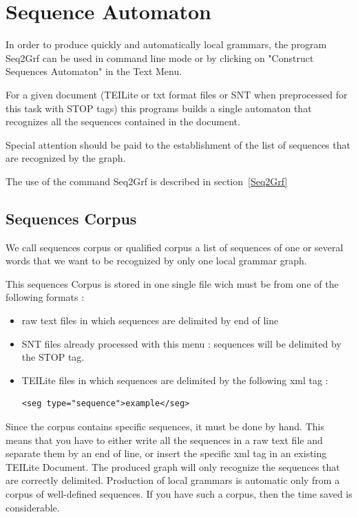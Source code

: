 \label{Sequence Automaton}
\chapter{Sequence Automaton}

In order to produce quickly and automatically local grammars, the program Seq2Grf can be used in command line mode or by clicking on "Construct Sequences Automaton" in the Text Menu.
\bigskip

For a given document (TEILite or txt format files or SNT when preprocessed for this task with {STOP} tags) this programs builds a single automaton that recognizes all the sequences contained in the document.
\bigskip

Special attention should be paid to the establishment of the list of sequences that are recognized by the graph.
\bigskip

The use of the command Seq2Grf is described in section~\ref{Seq2Grf}

\section{Sequences Corpus}
We call sequences corpus or qualified corpus a list of sequences of one or several words that we want to be recognized by only one local grammar graph. 
\bigskip

This sequences Corpus is stored in one single file wich must be from one of the following formats :
\begin{itemize}
	\item raw text files in which sequences are delimited by end of line 
	\item SNT files already processed with this menu : sequences will be delimited by the {STOP} tag.
	\item TEILite files in which sequences are delimited by the following xml tag :	
		\begin{verbatim}<seg type="sequence">example</seg>
		\end{verbatim}
\end{itemize}
\pagebreak 
\indent Since the corpus contains specific sequences, it must be done by hand. This means that you have to either write all the sequences in a raw text file and separate them by an end  of line, or insert the specific xml tag in an existing TEILite Document. The produced graph will only recognize the sequences that are correctly delimited. Production of local grammars is automatic only from a corpus of well-defined sequences. If you have such a corpus, then the time saved is considerable.


